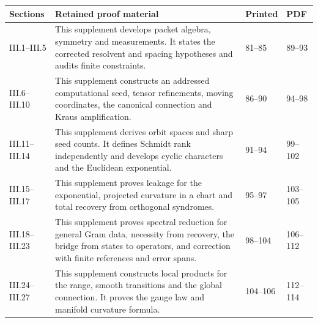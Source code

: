 {\small\begin{longtable}{@{}p{.14\linewidth}p{.51\linewidth}p{.14\linewidth}p{.12\linewidth}@{}}\toprule Sections & Retained proof material & Printed & PDF\\\midrule\endhead
III.1–III.5 & This supplement develops packet algebra, symmetry and measurements. It states the corrected resolvent and spacing hypotheses and audits finite constraints. & 81–85 & 89–93\\
III.6–III.10 & This supplement constructs an addressed computational seed, tensor refinements, moving coordinates, the canonical connection and Kraus amplification. & 86–90 & 94–98\\
III.11–III.14 & This supplement derives orbit spaces and sharp seed counts. It defines Schmidt rank independently and develops cyclic characters and the Euclidean exponential. & 91–94 & 99–102\\
III.15–III.17 & This supplement proves leakage for the exponential, projected curvature in a chart and total recovery from orthogonal syndromes. & 95–97 & 103–105\\
III.18–III.23 & This supplement proves spectral reduction for general Gram data, necessity from recovery, the bridge from states to operators, and correction with finite references and error spans. & 98–104 & 106–112\\
III.24–III.27 & This supplement constructs local products for the range, smooth transitions and the global connection. It proves the gauge law and manifold curvature formula. & 104–106 & 112–114\\
\bottomrule\end{longtable}}
